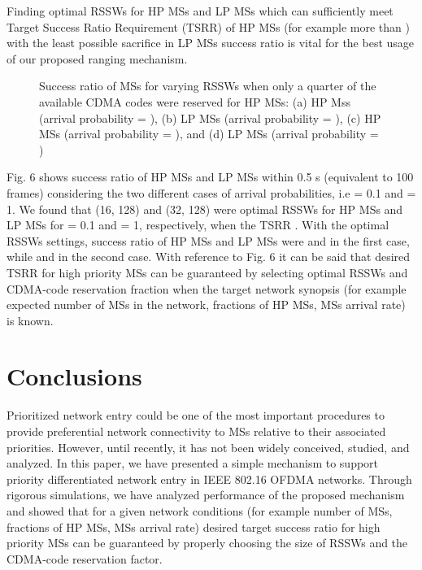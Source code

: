 \documentclass[preprint,12pt]{elsarticle}
\begin{document}
Finding optimal RSSWs for HP MSs and LP MSs which can sufficiently meet Target Success Ratio Requirement (TSRR) of HP MSs (for example more than ) with the least possible sacrifice in LP MSs success ratio is vital for the best usage of our proposed ranging mechanism.

\begin{figure}[h]
\centering
{}
\caption{Success ratio of MSs for varying RSSWs when only a quarter of the available CDMA codes were reserved for HP MSs: (a) HP Mss (arrival probability = ), (b) LP MSs (arrival probability = ), (c) HP MSs (arrival probability = ), and (d) LP MSs (arrival probability = )}
\end{figure}

Fig. 6 shows success ratio of HP MSs and LP MSs within 0.5 s (equivalent to 100 frames) considering the two different cases of arrival probabilities, i.e  = 0.1 and  = 1. We found that (16, 128) and (32, 128) were optimal RSSWs for HP MSs and LP MSs for  = 0.1 and  = 1, respectively, when the TSRR . With the optimal RSSWs settings, success ratio of HP MSs and LP MSs were  and  in the first case, while  and  in the second case. With reference to Fig. 6 it can be said that desired TSRR for high priority MSs can be guaranteed by selecting optimal RSSWs and CDMA-code reservation fraction when the target network synopsis (for example expected number of MSs in the network, fractions of HP MSs, MSs arrival rate) is known.


\section{Conclusions}
Prioritized network entry could be one of the most important procedures to provide preferential network connectivity to MSs relative to their associated priorities. However, until recently, it has not been widely conceived, studied, and analyzed. In this paper, we have presented a simple mechanism to support priority differentiated network entry in IEEE 802.16 OFDMA networks. Through rigorous simulations, we have analyzed performance of the proposed mechanism and showed that for a given network conditions (for example number of MSs, fractions of HP MSs, MSs arrival rate) desired target success ratio for high priority MSs can be guaranteed by properly choosing the size of RSSWs and the CDMA-code reservation factor.
\end{document}
